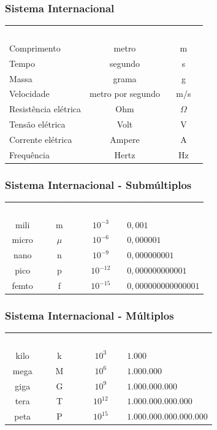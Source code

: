 \documentclass[aspectratio=169,
				xcolor=table]{beamer}
\begin{document}
	\begin{frame}
		\frametitle{Sistema Internacional}
		\begin{eftable}
			\Large
			\begin{tabular}{l | c | c}
			\textcolor{white}{Medida} &
			\textcolor{white}{Unidade} &
			\textcolor{white}{Símbolo} \\
			Comprimento & metro & m \\
			Tempo & segundo & s \\
			Massa & grama & g \\
			Velocidade & metro por segundo & m/s \\
			Resistência elétrica & Ohm & $\Omega$ \\
			Tensão elétrica & Volt & V \\
			Corrente elétrica & Ampere & A \\
			Frequência & Hertz & Hz
			
			
			\end{tabular}
		\end{eftable}
	\end{frame}
	
	\begin{frame}
		\frametitle{Sistema Internacional - Submúltiplos}
		\begin{eftable}
			\Large
			\begin{tabular}{c | c | c | l}
				\textcolor{white}{Prefixo} &
				\textcolor{white}{Símbolo} &				
				\textcolor{white}{Expoente} &
				\textcolor{white}{Explícito} \\
				mili  & m & $10^{-3}$  & $0,001$ \\
				micro &  $\mu$ & $10^{-6}$  & $0,000001$ \\
				nano  & n & $10^{-9}$  & $0,000000001$ \\
				pico  & p & $10^{-12}$ & $0,000000000001$ \\
				femto & f & $10^{-15}$ & $0,000000000000001$ \\				
			\end{tabular}
		\end{eftable}
	\end{frame}

	\begin{frame}
		\frametitle{Sistema Internacional - Múltiplos}
		\begin{eftable}
			\Large
			\begin{tabular}{c | c | c | l}
				\textcolor{white}{Prefixo} &
				\textcolor{white}{Símbolo} &
				\textcolor{white}{Expoente} &
				\textcolor{white}{Explícito} \\
				kilo & k & $10^{3}$  & $1.000$ \\
				mega & M & $10^{6}$  & $1.000.000$ \\
				giga & G & $10^{9}$  & $1.000.000.000$ \\
				tera & T & $10^{12}$ & $1.000.000.000.000$ \\
				peta & P & $10^{15}$ & $1.000.000.000.000.000$ \\
			\end{tabular}
		\end{eftable}
	\end{frame}
	
\end{document}
